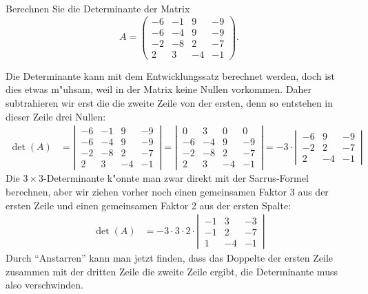 Berechnen Sie die Determinante der Matrix
\[
A=\begin{pmatrix}
-6&-1& 9&-9\\
-6&-4& 9&-9\\
-2&-8& 2&-7\\
 2& 3&-4&-1
\end{pmatrix}.
\]

\begin{loesung}
Die Determinante kann mit dem Entwicklungssatz berechnet werden, doch
ist dies etwas m"uhsam, weil in der Matrix keine Nullen vorkommen.
Daher subtrahieren wir erst die die zweite Zeile von der ersten, denn
so entstehen in dieser Zeile drei Nullen:
\begin{align*}
\det(A)
&=
\left|\,\begin{matrix}
-6&-1& 9&-9\\
-6&-4& 9&-9\\
-2&-8& 2&-7\\
 2& 3&-4&-1
\end{matrix}\,\right|
=
\left|\,\begin{matrix}
 0& 3& 0& 0\\
-6&-4& 9&-9\\
-2&-8& 2&-7\\
 2& 3&-4&-1
\end{matrix}\,\right|
=
-3\cdot\left|\,\begin{matrix}
-6& 9&-9\\
-2& 2&-7\\
 2&-4&-1
\end{matrix}\,\right|
\end{align*}
Die $3\times 3$-Determinante k"onnte man zwar direkt mit der
Sarrus-Formel berechnen, aber wir ziehen vorher noch einen gemeinsamen
Faktor 3 aus der ersten Zeile und einen gemeinsamen Faktor 2 aus der
ersten Spalte:
\begin{align}
\det(A)
&=
-3\cdot 3\cdot 2\cdot\left|\,\begin{matrix}
-1& 3&-3\\
-1& 2&-7\\
 1&-4&-1
\end{matrix}\,\right|
\label{20000037:3det}
\end{align}
Durch ``Anstarren'' kann man jetzt finden, dass das Doppelte der ersten
Zeile zusammen mit der dritten Zeile die zweite Zeile ergibt, die Determinante
muss also verschwinden.


\end{loesung}
